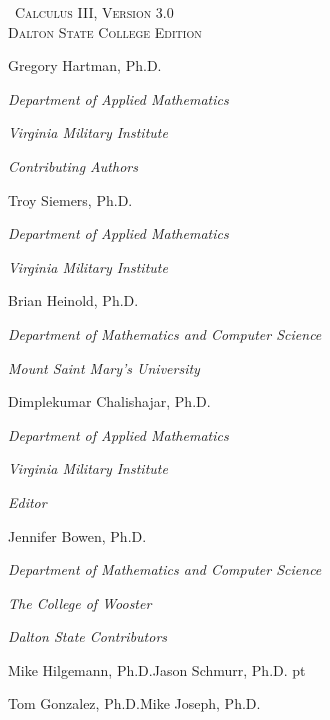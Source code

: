 
\hskip 125pt\begin{minipage}{\textwidth}
\begin{flushright}

\textsc{\large \apex\ {\Huge Calculus III}, {\small Version 3.0}} \\

\textsc{Dalton State College Edition}\\
{
\Large
\vspace{0.25in}

Gregory Hartman, Ph.D.

\emph{\small Department of Applied Mathematics}

\emph{\small Virginia Military Institute}\vskip15pt

\parbox{200pt}{\textit{Contributing Authors}}\hskip 2cm \phantom{.}

Troy Siemers, Ph.D.

\emph{\small Department of Applied Mathematics}

\emph{\small Virginia Military Institute}\vskip 15pt

Brian Heinold, Ph.D.

\emph{\small Department of Mathematics and Computer Science}

\emph{\small Mount Saint Mary's University}\vskip 15pt

Dimplekumar Chalishajar, Ph.D.

\emph{\small Department of Applied Mathematics}

\emph{\small Virginia Military Institute}\vskip 15pt

\parbox{200pt}{\textit{Editor}}\hskip 2cm \phantom{.}

Jennifer Bowen, Ph.D.

\emph{\small Department of Mathematics and Computer Science}

\emph{\small The College of Wooster} \vskip 15pt

\parbox{200pt}{\textit{Dalton State Contributors}}\hskip 2cm \phantom{.}

\large\vskip 4pt

Mike Hilgemann, Ph.D.\qquad Jason Schmurr, Ph.D. pt

Tom Gonzalez, Ph.D.\phantom{D.}\qquad Mike Joseph, Ph.D.}
\normalsize
\end{flushright}
\end{minipage}

